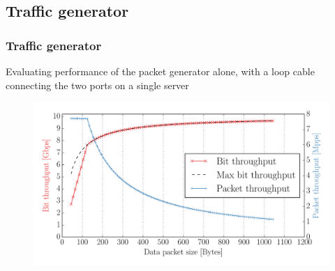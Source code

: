 \subsection{Traffic generator}
\begin{frame}[fragile]
  \frametitle{Traffic generator}
  Evaluating performance of the packet generator alone, with a loop cable connecting the two ports on a single server
  \begin{figure}
    \includegraphics[height=.65\textheight]{img/traffgen_increasing_len.pdf}
  \end{figure}
\end{frame}

